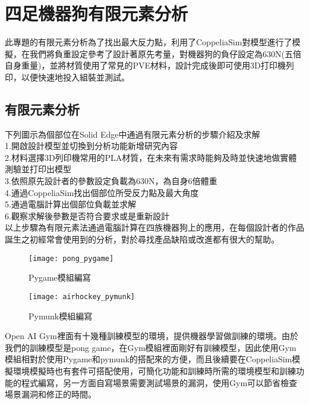 \chapter{四足機器狗有限元素分析}

此專題的有限元素分析為了找出最大反力點，利用了CoppeliaSim對模型進行了模擬，在我們將負重設定參考了設計著原先考量，對機器狗的負仔設定為630N(五倍自身重量)，並將材質使用了常見的PVE材料，設計完成後即可使用3D打印機列印，以便快速地投入組裝並測試。\\

\section{有限元素分析}
 下列圖示為個部位在Solid Edge中通過有限元素分析的步驟介紹及求解\\
 
1.開啟設計模型並切換到分析功能新增研究內容\\

2.材料選擇3D列印機常用的PLA材質，在未來有需求時能夠及時並快速地做實體測驗並打印出模型\\

3.依照原先設計者的參數設定負載為630N，為自身6倍體重\\

4.通過CoppeliaSim找出個部位所受反力點及最大角度\\

5.通過電腦計算出個部位負載並求解\\

6.觀察求解後參數是否符合要求或是重新設計\\

以上步驟為有限元素法通過電腦計算在四族機器狗上的應用，在每個設計者的作品誕生之初經常會使用到的分析，對於尋找產品缺陷或改進都有很大的幫助。\\

\begin{figure}[hbt!]
\begin{center}
\texttt{[image: pong\_pygame]}
\caption{\Large Pygame模組編寫}
\label{fig.pong_pygame}
\end{center}
\end{figure}

\begin{figure}[hbt!]
\begin{center}
\texttt{[image: airhockey\_pymunk]}
\caption{\Large Pymunk模組編寫}
\label{fig.airhockey_pymunk}
\end{center}
\end{figure}
 \newpage %
 Open AI Gym裡面有十幾種訓練模型的環境，提供機器學習做訓練的環境。由於我們的訓練模型是pong game，在Gym模組裡面剛好有訓練模型，因此使用Gym模組相對於使用Pygame和pymunk的搭配來的方便，而且後續要在CoppeliaSim模擬環境模擬時也有套件可搭配使用，可簡化功能和訓練時所需的環境模型和訓練功能的程式編寫，另一方面自寫場景需要測試場景的漏洞，使用Gym可以節省檢查場景漏洞和修正的時間。\\
